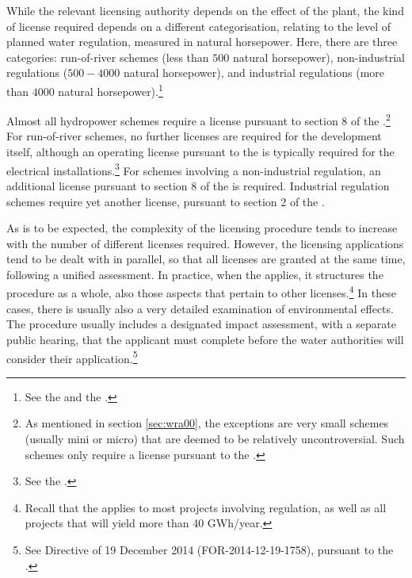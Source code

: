 {While the relevant licensing authority depends on the effect of the plant, the kind of license required depends on a different categorisation, relating to the level of planned water regulation, measured in natural horsepower. Here, there are three categories: run-of-river schemes  (less than $500$ natural horsepower), non-industrial regulations ($500 - 4000$ natural horsepower), and industrial regulations (more than $4000$ natural horsepower).\footnote{See the \dni\cite[2]{wra17} and the \dni\cite[1,2]{ica17}.}

Almost all hydropower schemes require a license pursuant to section 8 of the \cite{wra00}.\footnote{As mentioned in section \ref{sec:wra00}, the exceptions are very small schemes (usually mini or micro) that are deemed to be relatively uncontroversial. Such schemes only require a license pursuant to the \cite{pb08}.} For run-of-river schemes, no further licenses are required for the development itself, although an operating license pursuant to the \cite{ea90} is typically required for the electrical installations.\footnote{See the \dni\cite[3-1]{ea90}.} For schemes involving a non-industrial regulation, an additional license pursuant to section 8 of the \cite{wra17} is required. Industrial regulation schemes require yet another license, pursuant to section 2 of the \cite{ica17}.
}
As is to be expected, the complexity of the licensing procedure tends to increase with the number of different licenses required. However, the licensing applications tend to be dealt with in parallel, so that all licenses are granted at the same time, following a unified assessment. In practice, when the \cite{wra17} applies, it structures the procedure as a whole, also those aspects that pertain to other licenses.\footnote{Recall that the \cite{wra17} applies to most projects involving regulation, as well as all projects that will yield more than 40 GWh/year.} In these cases, there is usually also a very detailed examination of environmental effects. The procedure usually includes a designated impact assessment, with a separate public hearing, that the applicant must complete before the water authorities will consider their application.\footnote{See Directive of 19 December 2014 (FOR-2014-12-19-1758), pursuant to the \dni\cite[1-2,14-6]{pb08}.}
